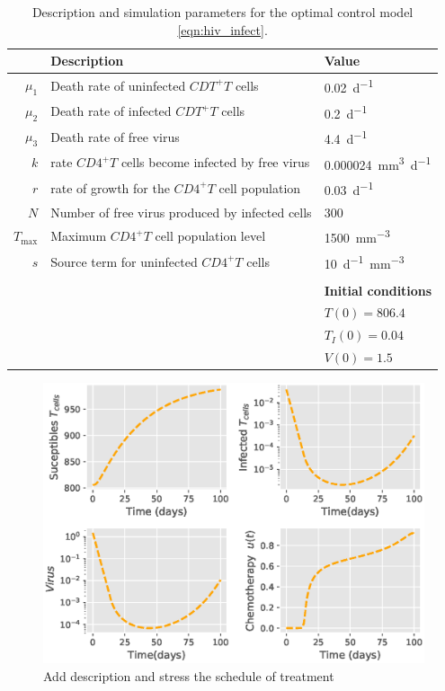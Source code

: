 \begin{table}
	\centering
	\begin{tabular}{rll}
		\toprule
			&\textbf{Description} & \textbf{Value}
            \\
        \midrule
		$\mu_1$ 
        	& Death rate of uninfected $CDT^+T$ cells
        	& \SI{0.02}{d^{-1}} 
            \\
		$\mu_2$ 
       		& Death rate of infected $CDT^+T$ cells
		    & \SI{0.2}{d^{-1}}
			\\
		$\mu_3$ 
      		& Death rate of free virus
		    & \SI{4.4}{d^{-1}}
            \\
        $k$ 
        	& rate $CD4^+T$ cells become infected by free virus
        	& \SI{0.000024}{\milli\meter^3 d^{-1}}
 			\\
		$r$ 
			& rate of growth for the $CD4^+T$ cell population
			& \SI{0.03}{d^{-1}}
     	    \\
     	$N$ 
     		& Number of free virus produced by infected cells
     		& \num{300}
            \\
     	$T_{\max{}}$ 
     		& Maximum $CD4^+T$ cell population level
     		& \SI{1500}{\milli \meter ^ {-3}}
     		\\
     	$s$ 
     		& Source term for uninfected $CD4^{+}T$ cells
     		& \SI{10}{d^{-1}\milli \meter ^{-3}}
		\\
		\\
	    &&
	    \textbf{Initial conditions}
	    \\
	    \cmidrule{3-3}
	    && $T(0) = \num{806.4}$
	    \\
	    && $T_{I}(0)=\num{0.04}$
	    \\
	    && $V(0)= \num{1.5}$
	    \\
		\bottomrule
    \end{tabular}
	\caption{
		Description and simulation parameters for the optimal control model
		\eqref{eqn:hiv_infect}.
	}
	\label{tbl:hiv_infect}
\end{table}






\begin{figure}[tbh]
\centering
	\includegraphics[width=0.7\linewidth]{Figures/hiv_chemotherapy_fig_01}
	\caption{Add description and stress the schedule of treatment}
	\label{fig:hivchemotherapyfig01}
\end{figure}
